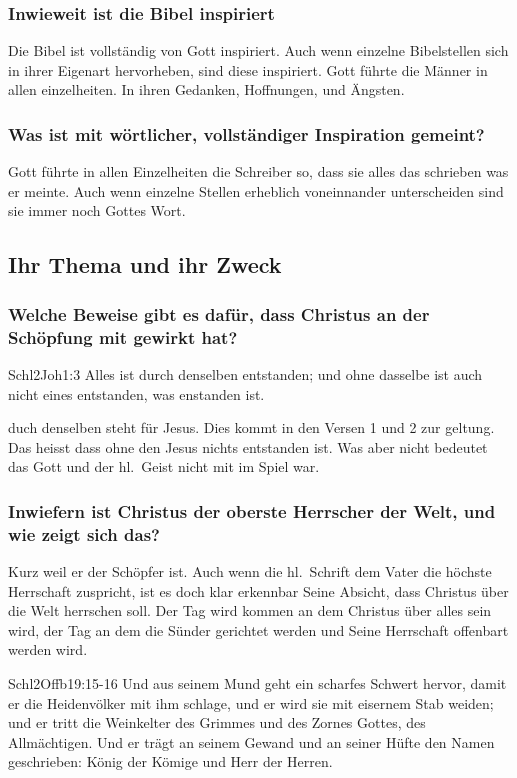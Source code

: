 \subsubsection{Inwieweit ist die Bibel inspiriert}
Die Bibel ist vollständig von Gott inspiriert. Auch wenn einzelne Bibelstellen sich in ihrer Eigenart hervorheben, sind diese inspiriert. Gott führte die Männer in allen einzelheiten. In ihren Gedanken, Hoffnungen, und Ängsten.
\subsubsection{Was ist mit wörtlicher, vollständiger Inspiration gemeint?}
Gott führte in allen Einzelheiten die Schreiber so, dass sie alles das schrieben was er meinte. Auch wenn einzelne Stellen erheblich voneinnander unterscheiden sind sie immer noch Gottes Wort.
\subsection{Ihr Thema und ihr Zweck}
\subsubsection{Welche Beweise gibt es dafür, dass Christus an der Schöpfung mit gewirkt hat?}
\begin{bibeltext}{Schl2}{Joh}{1:3}
	Alles ist durch denselben entstanden; und ohne dasselbe ist auch nicht eines entstanden, was enstanden ist.
\end{bibeltext}
\flqq duch denselben \frqq{} steht für Jesus. Dies kommt in den Versen 1 und 2 zur geltung. Das heisst dass ohne den Jesus nichts entstanden ist. Was aber nicht bedeutet das Gott und der hl.\ Geist nicht mit im Spiel war.
\subsubsection{Inwiefern ist Christus der oberste Herrscher der Welt, und wie zeigt sich das?}
	Kurz weil er der Schöpfer ist. Auch wenn die hl.\ Schrift dem Vater die höchste Herrschaft zuspricht, ist es doch klar erkennbar Seine Absicht, dass Christus über die Welt herrschen soll. Der Tag wird kommen an dem Christus über alles sein wird, der Tag an dem die Sünder gerichtet werden und Seine Herrschaft offenbart werden wird.
	\begin{bibeltext}{Schl2}{Offb}{19:15-16}
		Und aus seinem Mund geht ein scharfes Schwert hervor, damit er die Heidenvölker mit ihm schlage, und er wird sie mit eisernem Stab weiden; und er tritt die Weinkelter des Grimmes und des Zornes Gottes, des Allmächtigen. Und er trägt an seinem Gewand und an seiner Hüfte den Namen geschrieben: \flqq König der Kömige und Herr der Herren\frqq{}.
	\end{bibeltext}
